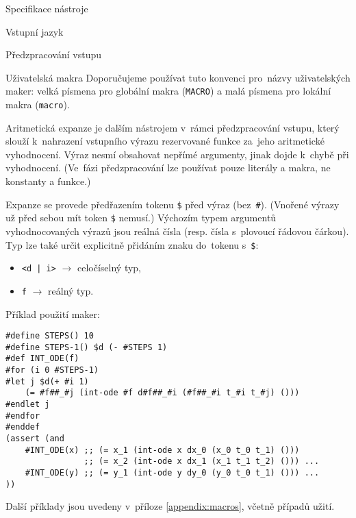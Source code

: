 \documentclass[thesis=M,czech]{FITthesis}[2012/06/26]
\newcommand{\id}[1]{\texttt{#1}}
\newcommand{\rf}[1]{\ref{#1}}
\begin{document}
\begin{section}{Specifikace nástroje}
\begin{subsection}{Vstupní jazyk}
\begin{subsubsection}{Předzpracování vstupu}
\begin{paragraph}{Uživatelská makra}
Doporučujeme používat tuto konvenci pro~názvy uživatelských maker:
velká písmena pro globální makra (\id{MACRO})
a malá písmena pro lokální makra (\id{macro}).
\end{paragraph} %


\begin{paragraph}{Aritmetická expanze}\label{p:design:spec:ilang:macros:arith}
je dalším nástrojem v~rámci předzpracování vstupu,
který slouží k~nahrazení vstupního výrazu rezervované funkce
za~jeho aritmetické vyhodnocení.
Výraz nesmí obsahovat nepřímé argumenty,
jinak dojde k~chybě při vyhodnocení.
(Ve~fázi předzpracování lze používat pouze literály a makra,
ne konstanty a funkce.)

Expanze se provede předřazením tokenu \id{\$} před výraz (bez~\id{\#}).
(Vnořené výrazy už před sebou mít token \id{\$} nemusí.)
Výchozím typem argumentů vyhodnocovaných výrazů
jsou reálná čísla (resp. čísla s~plovoucí řádovou čárkou).
Typ lze také určit explicitně
přidáním znaku do~tokenu s~\id{\$}:
\begin{itemize}
\item \id{<d | i>} $\rightarrow$ celočíselný typ,
\item \id{f} $\rightarrow$ reálný typ.
\end{itemize}
\end{paragraph} %



\begin{paragraph}{Příklad použití maker:}
\label{p:design:spec:ilang:macros:examples}
\begin{Verbatim}[samepage=true]
#define STEPS() 10
#define STEPS-1() $d (- #STEPS 1)
#def INT_ODE(f)
#for (i 0 #STEPS-1)
#let j $d(+ #i 1)
    (= #f##_#j (int-ode #f d#f##_#i (#f##_#i t_#i t_#j) ()))
#endlet j
#endfor
#enddef
(assert (and
    #INT_ODE(x) ;; (= x_1 (int-ode x dx_0 (x_0 t_0 t_1) ()))
                ;; (= x_2 (int-ode x dx_1 (x_1 t_1 t_2) ())) ...
    #INT_ODE(y) ;; (= y_1 (int-ode y dy_0 (y_0 t_0 t_1) ())) ...
))
\end{Verbatim}

Další příklady jsou uvedeny
v~příloze \rf{appendix:macros},
včetně případů užití.
\end{paragraph} %


\end{subsubsection} %


\end{subsection}
\end{section}
\end{document}
